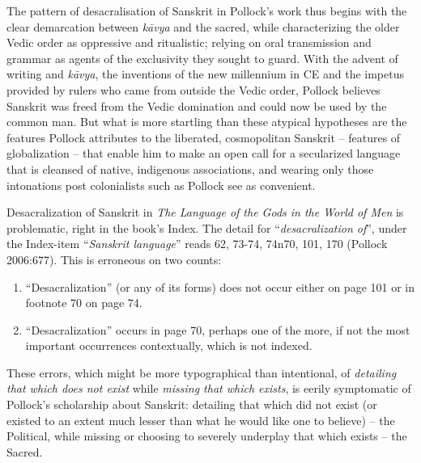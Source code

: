 The pattern of desacralisation of Sanskrit in Pollock’s work thus begins with the clear demarcation between \textit{kāvya} and the sacred, while characterizing the older Vedic order as oppressive and ritualistic; relying on oral transmission and grammar as agents of the exclusivity they sought to guard. With the advent of writing and \textit{kāvya}, the inventions of the new millennium in CE and the impetus provided by rulers who came from outside the Vedic order, Pollock believes Sanskrit was freed from the Vedic domination and could now be used by the common man. But what is more startling than these atypical hypotheses are the features Pollock attributes to the liberated, cosmopolitan Sanskrit – features of globalization – that enable him to make an open call for a secularized language that is cleansed of native, indigenous associations, and wearing only those intonations post colonialists such as Pollock see as convenient.

Desacralization of Sanskrit in \textit{The Language of the Gods in the World of Men} is problematic, right in the book’s Index. The detail for “\textit{desacralization of}”, under the Index-item “\textit{Sanskrit language}” reads 62, 73-74, 74n70, 101, 170 (Pollock 2006:677). This is erroneous on two counts:

\begin{enumerate}
\item “Desacralization” (or any of its forms) does not occur either on page 101 or in footnote 70 on page 74.

 \item “Desacralization” occurs in page 70, perhaps one of the more, if not the most important occurrences contextually, which is not indexed.

\end{enumerate}

These errors, which might be more typographical than intentional, of \textit{detailing that which does not exist} while \textit{missing that which exists}, is eerily symptomatic of Pollock’s scholarship about Sanskrit: detailing that which did not exist (or existed to an extent much lesser than what he would like one to believe) – the Political, while missing\textit{} or choosing to severely underplay that which exists – the Sacred.

